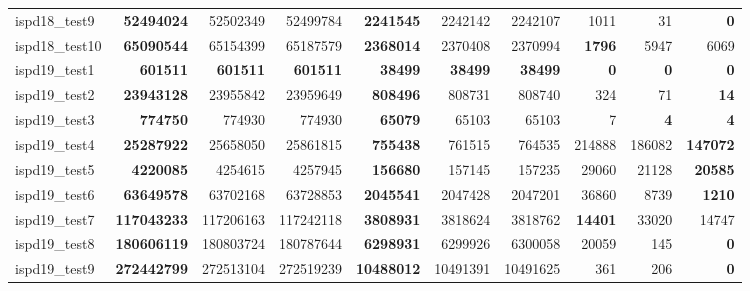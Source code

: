 \begin{table}[!htbp]
{\begin{tabular}{l rrr rrr rrr}
            ispd18\_test9          & \textbf{52494024} & 52502349          & 52499784         & \textbf{2241545} & 2242142           & 2242107          & 1011           & 31              & \textbf{0}    \\
            ispd18\_test10         & \textbf{65090544} & 65154399          & 65187579         & \textbf{2368014} & 2370408           & 2370994          & \textbf{1796}   & 5947            & 6069           \\
            ispd19\_test1          & \textbf{601511}   & \textbf{601511}   & \textbf{601511}  & \textbf{38499}   & \textbf{38499}    & \textbf{38499}   & \textbf{0}      & \textbf{0}      & \textbf{0}    \\
            ispd19\_test2          & \textbf{23943128} & 23955842          & 23959649         & \textbf{808496}  & 808731            & 808740           & 324            & 71              & \textbf{14}   \\
            ispd19\_test3          & \textbf{774750}   & 774930            & 774930           & \textbf{65079}   & 65103             & 65103            & 7              & \textbf{4}      & \textbf{4}    \\
            ispd19\_test4          & \textbf{25287922} & 25658050          & 25861815         & \textbf{755438}  & 761515            & 764535           & 214888         & 186082          & \textbf{147072} \\
            ispd19\_test5          & \textbf{4220085}  & 4254615           & 4257945          & \textbf{156680}  & 157145            & 157235           & 29060          & 21128           & \textbf{20585} \\
            ispd19\_test6          & \textbf{63649578} & 63702168          & 63728853         & \textbf{2045541} & 2047428           & 2047201          & 36860          & 8739            & \textbf{1210} \\
            ispd19\_test7          & \textbf{117043233} & 117206163         & 117242118        & \textbf{3808931} & 3818624           & 3818762          & \textbf{14401} & 33020           & 14747          \\
            ispd19\_test8          & \textbf{180606119} & 180803724         & 180787644        & \textbf{6298931} & 6299926           & 6300058          & 20059          & 145             & \textbf{0}    \\
            ispd19\_test9          & \textbf{272442799} & 272513104         & 272519239        & \textbf{10488012} & 10491391          & 10491625         & 361            & 206             & \textbf{0}    \\

\end{tabular}}
\end{table}
